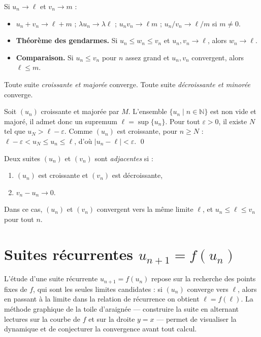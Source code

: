 \documentclass[11pt,a4paper,twoside]{book}
\newcommand{\N}{\mathbb{N}}
\begin{document}
\begin{theoremebox}
Si $u_n \to \ell$ et $v_n \to m$ :
\begin{itemize}
  \item $u_n + v_n \to \ell + m$ ; $\lambda u_n \to \lambda \ell$ ; $u_n v_n \to \ell m$ ; $u_n/v_n \to \ell/m$ si $m\neq 0$.
  \item \textbf{Théorème des gendarmes.} Si $u_n \leq w_n \leq v_n$ et $u_n, v_n \to \ell$, alors $w_n \to \ell$.
  \item \textbf{Comparaison.} Si $u_n \leq v_n$ pour $n$ assez grand et $u_n,v_n$ convergent, alors $\ell \leq m$.
\end{itemize}
\end{theoremebox}

\begin{theoremebox}
Toute suite \emph{croissante et majorée} converge.
Toute suite \emph{décroissante et minorée} converge.
\end{theoremebox}

\begin{preuvebox}
Soit $(u_n)$ croissante et majorée par $M$. L'ensemble $\{u_n \mid n\in\N\}$ est non vide et majoré, il admet donc un supremum $\ell = \sup\{u_n\}$. Pour tout $\varepsilon>0$, il existe $N$ tel que $u_N > \ell - \varepsilon$. Comme $(u_n)$ est croissante, pour $n\geq N$ : $\ell - \varepsilon < u_N \leq u_n \leq \ell$, d'où $|u_n - \ell| < \varepsilon$. \qed
\end{preuvebox}

\begin{theoremebox}
Deux suites $(u_n)$ et $(v_n)$ sont \emph{adjacentes} si :
\begin{enumerate}[label=\roman*)]
  \item $(u_n)$ est croissante et $(v_n)$ est décroissante,
  \item $v_n - u_n \to 0$.
\end{enumerate}
Dans ce cas, $(u_n)$ et $(v_n)$ convergent vers la même limite $\ell$, et $u_n \leq \ell \leq v_n$ pour tout $n$.
\end{theoremebox}

\section{Suites récurrentes $u_{n+1} = f(u_n)$}

L'étude d'une suite récurrente $u_{n+1} = f(u_n)$ repose sur la recherche des points fixes de $f$, qui sont les seules limites candidates : si $(u_n)$ converge vers $\ell$, alors en passant à la limite dans la relation de récurrence on obtient $\ell = f(\ell)$. La méthode graphique de la toile d'araignée — construire la suite en alternant lectures sur la courbe de $f$ et sur la droite $y = x$ — permet de visualiser la dynamique et de conjecturer la convergence avant tout calcul.
\end{document}
